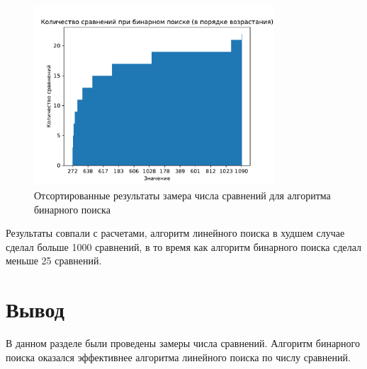 \begin{figure}[h!]
	\centering
	\includegraphics[width=0.8\textwidth]{tex_parts/sorted_graph.pdf}
	\caption{\label{fig:res3} Отсортированные результаты замера числа сравнений для алгоритма бинарного поиска}
\end{figure}

\clearpage

Результаты совпали с расчетами, алгоритм линейного поиска в худшем случае сделал больше 1000 сравнений, в то время как алгоритм бинарного поиска сделал меньше 25 сравнений.

\section{Вывод}

В данном разделе были проведены замеры числа сравнений. Алгоритм бинарного поиска оказался эффективнее алгоритма линейного поиска по числу сравнений. 
